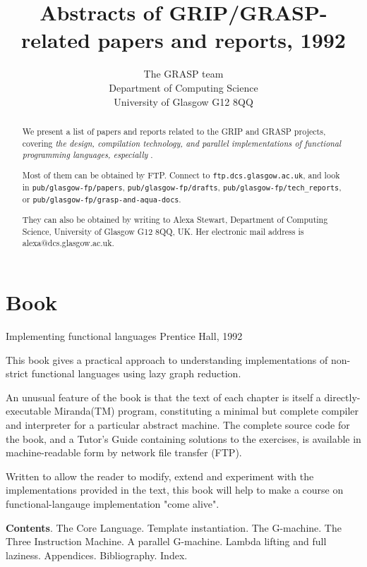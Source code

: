 


\title{Abstracts of GRIP/GRASP-related papers and reports, 1992
}

\author{The GRASP team \\ Department of Computing Science \\
University of Glasgow G12 8QQ
}

\maketitle

\begin{abstract}
We present a list of papers and reports related to the GRIP 
and GRASP projects,
covering {\em the design, compilation technology,
and parallel implementations of functional programming languages, especially
\Haskell{}}.

Most of them can be obtained by FTP.  Connect to {\tt ftp.dcs.glasgow.ac.uk},
and look in {\tt pub/glasgow-fp/papers}, {\tt pub/glasgow-fp/drafts}, {\tt pub/glasgow-fp/tech\_reports},
or {\tt pub/glasgow-fp/grasp-and-aqua-docs}.

They can also be obtained by writing to 
Alexa Stewart, Department of Computing Science,
University of Glasgow G12 8QQ, UK.   Her electronic mail address is
alexa@dcs.glasgow.ac.uk.
\end{abstract}

\section{Book}

{Implementing functional languages}
{Prentice Hall, 1992}
{
This book gives a practical approach to understanding implementations
of non-strict functional languages using lazy graph reduction.

An unusual feature of the book is that the text of each chapter is
itself a directly-executable Miranda(TM) program, constituting a
minimal but complete compiler and interpreter for a particular
abstract machine.  The complete source code for the book, and a
Tutor's Guide containing solutions to the exercises, is available in
machine-readable form by network file transfer (FTP).

Written to allow the reader to modify, extend and experiment with the
implementations provided in the text, this book will help to make a
course on functional-langauge implementation "come alive".

{\bf Contents}.  The Core Language.  Template instantiation.  The G-machine.
The Three Instruction Machine.  A parallel G-machine.  Lambda lifting
and full laziness.  Appendices.  Bibliography.  Index.
}



